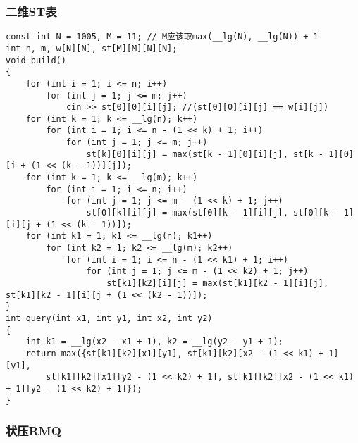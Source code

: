 \documentclass[a4paper, fontset=none]{ctexart}
\begin{document}
\subsubsection{二维ST表}
\begin{verbatim}
const int N = 1005, M = 11; // M应该取max(__lg(N), __lg(N)) + 1
int n, m, w[N][N], st[M][M][N][N];
void build()
{
    for (int i = 1; i <= n; i++)
        for (int j = 1; j <= m; j++)
            cin >> st[0][0][i][j]; //(st[0][0][i][j] == w[i][j])
    for (int k = 1; k <= __lg(n); k++)
        for (int i = 1; i <= n - (1 << k) + 1; i++)
            for (int j = 1; j <= m; j++)
                st[k][0][i][j] = max(st[k - 1][0][i][j], st[k - 1][0][i + (1 << (k - 1))][j]);
    for (int k = 1; k <= __lg(m); k++)
        for (int i = 1; i <= n; i++)
            for (int j = 1; j <= m - (1 << k) + 1; j++)
                st[0][k][i][j] = max(st[0][k - 1][i][j], st[0][k - 1][i][j + (1 << (k - 1))]);
    for (int k1 = 1; k1 <= __lg(n); k1++)
        for (int k2 = 1; k2 <= __lg(m); k2++)
            for (int i = 1; i <= n - (1 << k1) + 1; i++)
                for (int j = 1; j <= m - (1 << k2) + 1; j++)
                    st[k1][k2][i][j] = max(st[k1][k2 - 1][i][j], st[k1][k2 - 1][i][j + (1 << (k2 - 1))]);
}
int query(int x1, int y1, int x2, int y2)
{
    int k1 = __lg(x2 - x1 + 1), k2 = __lg(y2 - y1 + 1);
    return max({st[k1][k2][x1][y1], st[k1][k2][x2 - (1 << k1) + 1][y1],
        st[k1][k2][x1][y2 - (1 << k2) + 1], st[k1][k2][x2 - (1 << k1) + 1][y2 - (1 << k2) + 1]});
}
\end{verbatim}
\subsubsection{状压RMQ}
\end{document}
